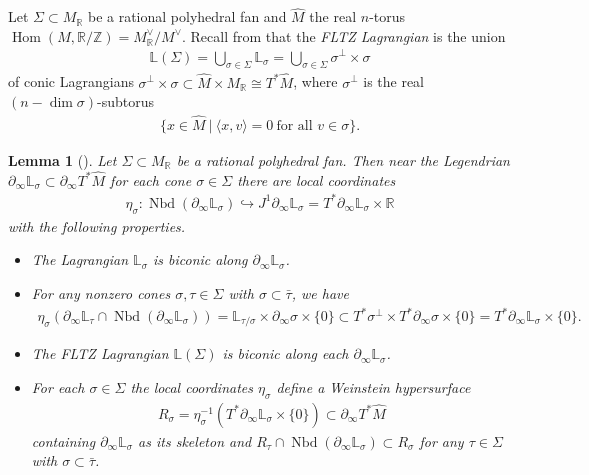 \documentclass[a4paper,12pt, twoside, pdftex]{amsart}
\newtheorem{lemma}[dummy]{Lemma}
\theoremstyle{definition}
\numberwithin{equation}{section}
\newcommand{\del}{\partial}
\newcommand{\Hom}{\operatorname{Hom}}
\newcommand{\Nbd}{\operatorname{Nbd}}
\newcommand{\bL}{\mathbb{L}}
\newcommand{\bR}{\mathbb{R}}
\newcommand{\bZ}{\mathbb{Z}}
\begin{document}
Let
$\Sigma \subset M_\bR$
be a rational polyhedral fan
and
$\widehat{M}$
the real $n$-torus
$\Hom(M, \bR / \bZ) = M^\vee_\bR / M^\vee$.
Recall from
\cite[Section 3.1]{FLTZ12}
that
the
\emph{FLTZ Lagrangian}
is the union
\begin{align*}
\bL(\Sigma)
=
\bigcup_{\sigma \in \Sigma} \bL_\sigma
=
\bigcup_{\sigma \in \Sigma} \sigma^\perp \times \sigma
\end{align*}
of conic Lagrangians
$\sigma^\perp \times \sigma
\subset
\widehat{M} \times M_\bR
\cong
T^*\widehat{M}$,
where
$\sigma^\perp$
is the real $(n - \dim \sigma)$-subtorus
\begin{align*}
\{ x \in \widehat{M} \ | \ \langle x, v \rangle = 0 \ \text{for all } v \in \sigma \}.
\end{align*}

\begin{lemma}[{\cite[Lemma 4.16]{GS1}}] \label{lem:coordinates}
Let
$\Sigma \subset M_\bR$
be a rational polyhedral fan.
Then near the Legendrian
$\del_\infty \bL_\sigma \subset \del_\infty T^* \widehat{M}$
for each cone
$\sigma \in \Sigma$
there are local coordinates
\begin{align*}
\eta_\sigma
\colon
\Nbd(\del_\infty \bL_\sigma)
\hookrightarrow
J^1 \del_\infty \bL_\sigma = T^* \del_\infty \bL_\sigma \times \bR 
\end{align*}
with the following properties.
\begin{itemize}
\item[(1)]
The Lagrangian
$\bL_\sigma$
is biconic along
$\del_\infty \bL_\sigma$.
\item[(2)]
For any nonzero cones
$\sigma, \tau \in \Sigma$
with
$\sigma \subset \bar{\tau}$,
we have
\begin{align} \label{eq:recursive}
\eta_\sigma (\del_\infty \bL_\tau \cap \Nbd(\del_\infty \bL_\sigma))
=
\bL_{\tau / \sigma} \times \del_\infty \sigma \times \{ 0 \}
\subset
T^* \sigma^\perp \times T^* \del_\infty \sigma \times \{ 0 \} 
=
T^* \del_\infty \bL_\sigma \times \{ 0 \}.
\end{align}
\item[(3)]
The FLTZ Lagrangian
$\bL(\Sigma)$
is biconic along each
$\del_\infty \bL_\sigma$.
\item[(4)]
For each
$\sigma \in \Sigma$
the local coordinates
$\eta_\sigma$
define a Weinstein hypersurface
\begin{align*}
R_\sigma = \eta^{-1}_\sigma (T^* \del_\infty \bL_\sigma \times \{ 0 \})
\subset
\del_\infty T^* \widehat{M}
\end{align*}
containing
$\del_\infty \bL_\sigma$
as its skeleton
and
$R_\tau \cap \Nbd(\del_\infty \bL_\sigma) \subset R_\sigma$
for any
$\tau \in \Sigma$
with
$\sigma \subset \bar{\tau}$.
\end{itemize}
\end{lemma}
\end{document}
